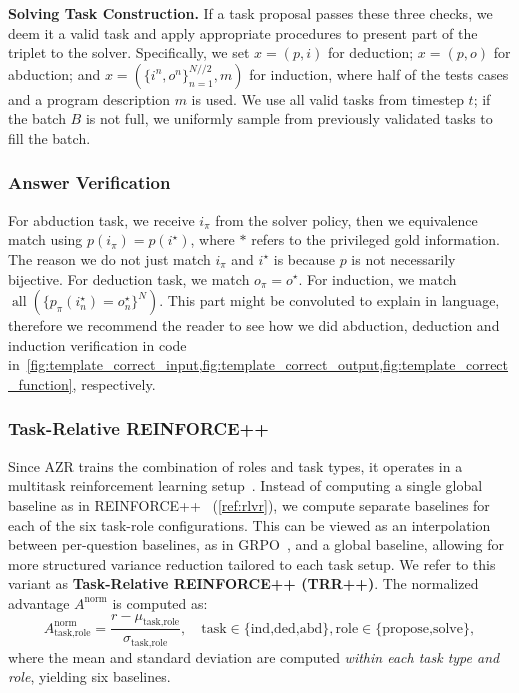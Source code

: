 \documentclass{article}
\begin{document}
\textbf{Solving Task Construction.}
If a task proposal passes these three checks, we deem it a valid task and apply appropriate procedures to present part of the triplet to the solver. Specifically, we set \(x = (p, i)\) for deduction; \(x = (p, o)\) for abduction; and \(x = (\{i^n, o^n\}^{N // 2}_{n=1}, m)\) for induction, where half of the tests cases and a program description $m$ is used. We use all valid tasks from timestep \(t\); if the batch \(B\) is not full, we uniformly sample from previously validated tasks to fill the batch.

\subsubsection{Answer Verification}
\label{sec:answer_verification}
For abduction task, we receive \(i_\pi\) from the solver policy, then we equivalence match using \(p(i_\pi)=p(i^\star)\), where \(*\) refers to the privileged gold information. The reason we do not just match \(i_\pi\) and \(i^\star\) is because \(p\) is not necessarily bijective. For deduction task, we match \(o_\pi=o^\star\). For induction, we match \(\operatorname{all}(\{p_\pi(i_n^\star)=o_n^\star\}^N)\). This part might be convoluted to explain in language, therefore we recommend the reader to see how we did abduction, deduction and induction verification in code in~\cref{fig:template_correct_input,fig:template_correct_output,fig:template_correct_function}, respectively.

\subsubsection{Task-Relative REINFORCE++}
\label{sec:trr}

Since AZR trains the combination of roles and task types, it operates in a multitask reinforcement learning setup~\citep{zhang2021survey,zhao2022mixture,wang2023train, yue2023understanding}. Instead of computing a single global baseline as in REINFORCE++~\citep{hu2025reinforce++} (\cref{ref:rlvr}), we compute separate baselines for each of the six task-role configurations. This can be viewed as an interpolation between per-question baselines, as in GRPO~\citep{Shao2024DeepSeekMathPT}, and a global baseline, allowing for more structured variance reduction tailored to each task setup. We refer to this variant as \textbf{Task-Relative REINFORCE++ (TRR++)}. The normalized advantage \(A^\text{norm}\) is computed as:
\begin{equation}
A^{\text{norm}}_{\text{task,role}} = \frac{r - \mu_{\text{task,role}}}{\sigma_{\text{task,role}}},\quad\text{task}\in\{\text{ind,ded,abd}\},\text{role}\in\{\text{propose,solve}\},
\end{equation}
where the mean and standard deviation are computed \emph{within each task type and role}, yielding six baselines.
\end{document}
